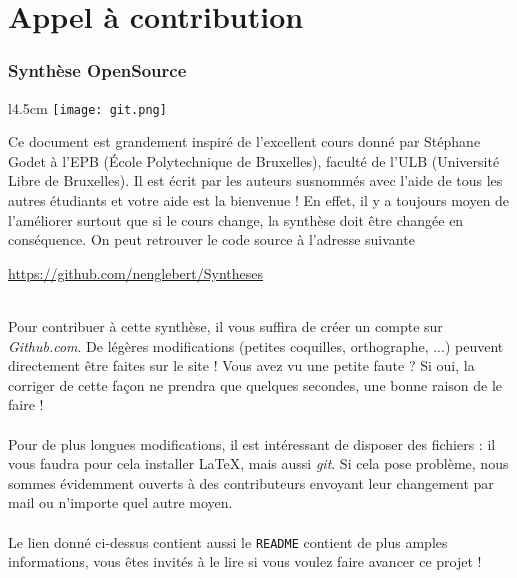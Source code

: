 \chapter*{Appel à contribution}
\subsection*{Synthèse OpenSource}
\begin{wrapfigure}[5]{l}{4.5cm}
\texttt{[image: git.png]}
\end{wrapfigure}
Ce document est grandement inspiré de l’excellent cours donné 
par Stéphane Godet à l’EPB (École Polytechnique de Bruxelles), faculté de l’ULB (Université 
Libre de Bruxelles). Il est écrit par les auteurs susnommés avec l’aide de tous les autres étudiants 
et votre aide est la bienvenue ! En effet, il y a toujours moyen de l’améliorer surtout que si le 
cours change, la synthèse doit être changée en conséquence. On peut retrouver le code source à l’adresse 
suivante
\begin{center}
\url{https://github.com/nenglebert/Syntheses}
\end{center}\ \\
Pour contribuer à cette synthèse, il vous suffira de créer un compte sur \textit{Github.com}. De
légères modifications (petites coquilles, orthographe, ...) peuvent directement être faites sur le
site ! Vous avez vu une petite faute ? Si oui, la corriger de cette façon ne prendra que quelques 
secondes, une bonne raison de le faire ! \\
\\
Pour de plus longues modifications, il est intéressant de disposer des fichiers : il vous 
faudra pour cela installer \LaTeX, mais aussi \textit{git}. Si cela pose problème, nous sommes 
évidemment ouverts à des contributeurs envoyant leur changement par mail ou n’importe quel autre 
moyen.\\
\\
Le lien donné ci-dessus contient aussi le \texttt{README} contient de plus amples informations, 
vous êtes invités à le lire si vous voulez faire avancer ce projet ! 

